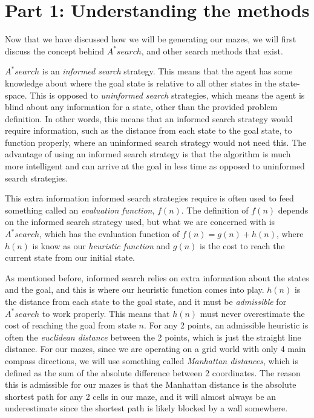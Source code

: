 
\section{Part 1:  Understanding the methods}
\label{sec:Part 1} 
Now that we have discussed how we will be generating our mazes, we will first discuss the concept behind $A^* search$, and other search methods that exist.


$A^* search$ is an \emph{informed search} strategy. This means that the agent has some knowledge about where the goal state is relative to all other states in the state-space. This is opposed to \emph{uninformed search} strategies, which means the agent is blind about any information for a state, other than the provided problem definition. In other words, this means that an informed search strategy would require information, such as the distance from each state to the goal state, to function properly, where an uninformed search strategy would not need this. The advantage of using an informed search strategy is that the algorithm is much more intelligent and can arrive at the goal in less time as opposed to uninformed search strategies.


This extra information informed search strategies require is often used to feed something called an \emph{evaluation function}, $f(n)$. The definition of $f(n)$ depends on the informed search strategy used, but what we are concerned with is $A^* search$, which has the evaluation function of $f(n) = g(n) + h(n)$, where $h(n)$ is know as our \emph{heuristic function} and $g(n)$ is the cost to reach the current state from our initial state.


As mentioned before, informed search relies on extra information about the states and the goal, and this is where our heuristic function comes into play. $h(n)$ is the distance from each state to the goal state, and it must be \emph{admissible} for $A^* search$ to work properly. This means that $h(n)$ must never overestimate the cost of reaching the goal from state $n$. For any 2 points, an admissible heuristic is often the \emph{euclidean distance} between the 2 points, which is just the straight line distance. For our mazes, since we are operating on a grid world with only 4 main compass directions, we will use something called \emph{Manhattan distances}, which is defined as the sum of the absolute difference between 2 coordinates. The reason this is admissible for our mazes is that the Manhattan distance is the absolute shortest path for any 2 cells in our maze, and it will almost always be an underestimate since the shortest path is likely blocked by a wall somewhere.


